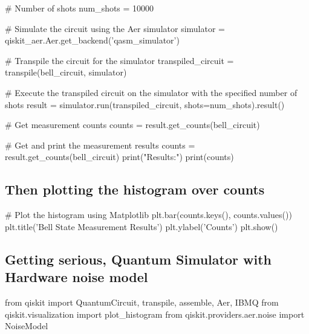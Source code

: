 \documentclass[%
oneside,                 %
final,                   %
10pt]{article}
\begin{document}
\bpycod
# Number of shots
num_shots = 10000

# Simulate the circuit using the Aer simulator
simulator = qiskit_aer.Aer.get_backend('qasm_simulator')

# Transpile the circuit for the simulator
transpiled_circuit = transpile(bell_circuit, simulator)

# Execute the transpiled circuit on the simulator with the specified number of shots
result = simulator.run(transpiled_circuit, shots=num_shots).result()

# Get measurement counts
counts = result.get_counts(bell_circuit)

# Get and print the measurement results
counts = result.get_counts(bell_circuit)
print("\nMeasurement Results:")
print(counts)

\epycod


\subsection{Then plotting the histogram over counts}






\bpycod
# Plot the histogram using Matplotlib
plt.bar(counts.keys(), counts.values())
plt.title('Bell State Measurement Results')
plt.ylabel('Counts')
plt.show()

\epycod


\subsection{Getting serious, Quantum Simulator with Hardware noise model}

































\bpycod
from qiskit import QuantumCircuit, transpile, assemble, Aer, IBMQ
from qiskit.visualization import plot_histogram
from qiskit.providers.aer.noise import NoiseModel
\end{document}
